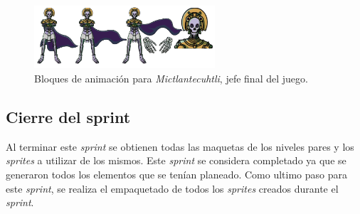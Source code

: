 \begin{figure}[h]
	\centering
	\includegraphics[width=0.6\textwidth]{03TrabajoRealizado/imagenes/Mictlantecuhtli.png}
 	\caption{Bloques de animación para \textit{Mictlantecuhtli}, jefe final del juego.}
	\label{fig:Mictlantecutli}		
\end{figure}

\subsection{Cierre del sprint}
Al terminar este \textit{sprint} se obtienen todas las maquetas de los niveles 
pares y los \textit{sprites} a utilizar de los mismos. Este \textit{sprint} se 
considera completado ya que se generaron todos los elementos que se tenían 
planeado. Como ultimo paso para este \textit{sprint}, se realiza el empaquetado 
de todos los \textit{sprites} creados durante el \textit{sprint}. 